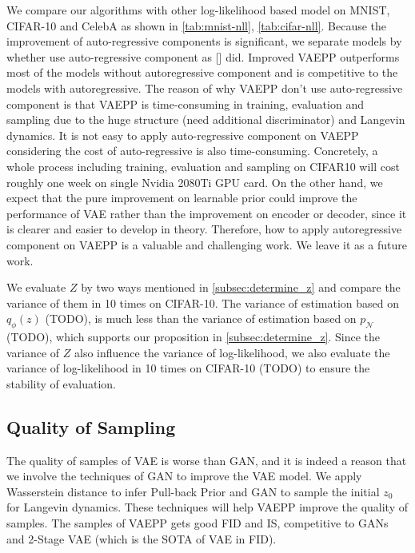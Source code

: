 We compare our algorithms with other log-likelihood based model on MNIST, CIFAR-10 and CelebA as shown in \cref{tab:mnist-nll}, \cref{tab:cifar-nll}. Because the improvement of auto-regressive components is significant, we separate models by whether use auto-regressive component as [] did. Improved VAEPP outperforms most of the models without autoregressive component and is competitive to the models with autoregressive. The reason of why VAEPP don't use auto-regressive component is that VAEPP is time-consuming in training,  evaluation and sampling due to the huge structure (need additional discriminator) and Langevin dynamics. It is not easy to apply auto-regressive component on VAEPP considering the cost of auto-regressive is also time-consuming. Concretely, a whole process including training, evaluation and sampling on CIFAR10 will cost roughly one week on single Nvidia 2080Ti GPU card. On the other hand, we expect that the pure improvement on learnable prior could improve the performance of VAE rather than the improvement on encoder or decoder, since it is clearer and easier to develop in theory. Therefore, how to apply autoregressive component on VAEPP is a valuable and challenging work. We leave it as a future work.

We evaluate $Z$ by two ways mentioned in \cref{subsec:determine_z} and compare the variance of them in 10 times on CIFAR-10. The variance of estimation based on $q_\phi(z)$ (TODO), is much less than the variance of estimation based on $p_\mathcal{N}$ (TODO), which supports our proposition in \cref{subsec:determine_z}. Since the variance of $Z$ also influence the variance of log-likelihood, we also evaluate the variance of log-likelihood in 10 times on CIFAR-10 (TODO) to ensure the stability of evaluation. 

\subsection{Quality of Sampling}
The quality of samples of VAE is worse than GAN, and it is indeed a reason that we involve the techniques of GAN to improve the VAE model. We apply Wasserstein distance to infer Pull-back Prior and GAN to sample the initial $z_0$ for Langevin dynamics. These techniques will help VAEPP improve the quality of samples. The samples of VAEPP gets good FID and IS, competitive to GANs and 2-Stage VAE (which is the SOTA of VAE in FID). 

